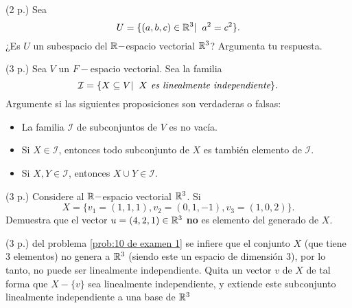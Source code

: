 \begin{prob}
(2 p.)
Sea 
\[
U = \{ (a, b, c) \in \mathbb{R}^{3}  | \hspace{0.2cm}
a^{2} = c^{2}  \}.
\]
¿Es $U$ un subespacio del $\mathbb{R}-$espacio vectorial
$\mathbb{R}^{3}$? Argumenta tu respuesta.
\end{prob}

\begin{prob}
(3 p.)
Sea $V$ un $F-$espacio vectorial. Sea la
familia
\[
\mathcal{I} = \{ X \subseteq V | \hspace{0.2cm}  X \textit{ es linealmente independiente} \}.
\]
Argumente si las siguientes proposiciones son
verdaderas o falsas:
\begin{itemize}
	\item La familia $\mathcal{I}$ de subconjuntos de $V$
	es no vacía.
	\item Si $X \in \mathcal{I}$, entonces
	todo subconjunto de $X$ es también
	elemento de $\mathcal{I}$.
	\item Si $X, Y \in \mathcal{I}$, 
	entonces $X \cup Y \in \mathcal{I}$.
\end{itemize}
\end{prob}

\begin{prob}
	\label{prob:10 de examen 1}
(3 p.) Considere al $\mathbb{R}-$espacio vectorial
$\mathbb{R}^{3}$. Si 
\[
X = \{ v_{1} = (1, 1, 1), v_{2}
= (0, 1, -1), v_{3}= (1, 0, 2) \}.
\]
Demuestra que el vector $u = (4, 2, 1) \in \mathbb{R}^{3}$ \textbf{no}
es elemento del generado de $X$.
\end{prob}

\begin{prob}
(3 p.) del problema \eqref{prob:10 de examen 1}
se infiere que el conjunto $X$
(que tiene $3$ elementos) no genera a 
$\mathbb{R}^{3}$ (siendo este un espacio de dimensión
$3$), por lo tanto, no puede ser
linealmente independiente.
Quita un vector $v$ de $X$ de tal forma que
$X - \{ v \}$ sea linealmente independiente,
y extiende este subconjunto linealmente
independiente a una base
de $\mathbb{R}^{3}$
\end{prob}

